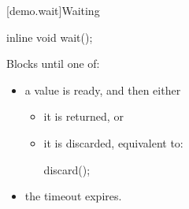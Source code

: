 [demo.wait]{Waiting}

%
\begin{itemdecl}
inline void wait();
\end{itemdecl}

\begin{itemdescr}
\pnum
\effects
Blocks until one of:
\begin{itemize}
\item a value is ready, and then either
\begin{itemize}
\item it is returned, or
\item it is discarded, equivalent to:
\begin{codeblock}
discard();
\end{codeblock}
\end{itemize}
\item the timeout expires.
\end{itemize}
\end{itemdescr}
